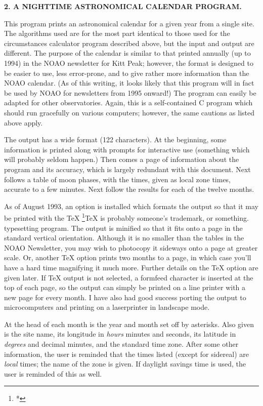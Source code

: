 \centerline{\bf 2. A NIGHTTIME ASTRONOMICAL CALENDAR PROGRAM.}
\par                     
This program prints an astronomical calendar for a given year
from a single site.  The algorithms used are for the most part
identical to those used for the circumstances calculator program
described above, but the input and output are different.
The purpose of the calendar is similar to that printed annually
(up to 1994)
in the NOAO newsletter for Kitt Peak; however, the format is
designed to be easier to use, less error-prone, and to give
rather more information than the NOAO calendar.  (As of this
writing, it looks likely that this program will in fact be
used by NOAO for newsletters from 1995 onward!)
The program can easily
be adapted for other observatories.  Again, this is a 
self-contained C program which should run gracefully on various computers;
however, the same cautions as listed above apply.

The output has a wide format (122 characters).  At the beginning,
some information is printed along with prompts for interactive use
(something which will probably seldom happen.)  Then comes a page
of information about the program and its accuracy, which
is largely redundant with this document.  Next follows a table
of moon phases, with the times, given as local zone times,
accurate to a few minutes.  Next follow the results
for each of the twelve months.  

As of August 1993, an option is installed which formats the 
output so that it may be printed with the TeX
\footnote{*}{TeX is probably someone's trademark, or something.}
typesetting
program.  The output is minified so that it fits onto a
page in the standard vertical orientation.  Although it is
no smaller than the tables in the NOAO Newsletter,
you may wish to photocopy it sideways onto a page at greater
scale.  Or, another TeX option prints two months to a page,
in which case you'll have a hard time magnifying it
much more.  Further details on the TeX option are given later.
If TeX output is not selected, a formfeed character is inserted
at the top of each page, 
so the output can simply be printed on a 
line printer with a new page for every month.  I have also
had good success porting the output to microcomputers and printing
on a laserprinter in landscape mode.  

At the head 
of each month is the year and month set off by asterisks.
Also given is the site name, its longitude in {\it hours} minutes and seconds,
its latitude in {\it degrees} and decimal minutes, and the standard time
zone.  After some other information, the user is reminded that the 
times listed (except for sidereal) are {\it local} times; the name of the
zone is given.  If daylight savings time is used, the user is reminded
of this as well.


